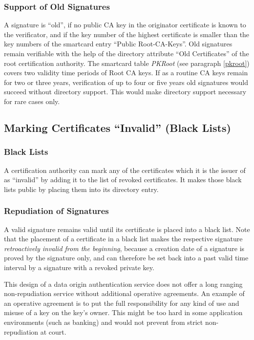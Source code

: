 \subsubsection{Support of Old Signatures}
\label{ops-sos}

A signature is ``old'', if no public CA key in the
originator certificate is known to the verificator,
and if the key number of the highest certificate
is smaller than the key numbers of the smartcard entry
``Public Root-CA-Keys''.
Old signatures remain verifiable with the help of the directory
attribute ``Old Certificates'' of the root certification authority.
The smartcard table {\em PKRoot} (see paragraph \ref{pkroot})
covers two validity time periods of Root CA keys.
If as a routine CA keys remain for two or three years,
verification of up to four or five years old signatures
would succeed without directory support.
This would make directory support necessary for rare cases only.

\subsection{Marking Certificates ``Invalid'' (Black Lists)}
\label{ops-mci}

\subsubsection{Black Lists}
\label{ops-bl}

A certification authority can mark any of the certificates which
it is the issuer of as ``invalid'' by adding it to the
list of revoked certificates. It makes those black lists
public by placing them into its directory entry.

\subsubsection{Repudiation of Signatures}
\label{ops-ros}

A valid signature remains valid until its certificate is placed
into a black list.
Note that the placement of a certificate in a black list
makes the respective signature {\em retroactively
invalid from the beginning},
because a creation date of a signature is proved by the signature only,
and can therefore be set back into a past valid time interval
by a signature with a revoked private key.

This design of a data origin authentication service
does not offer a long ranging non-repudiation service
without additional operative agreements.
An example of an operative agreement is
to put the full responsibility for any kind of use and misuse of a key
on the key's owner.
This might be too hard in some application environments
(such as banking) and would not prevent from strict
non-repudiation at court.

